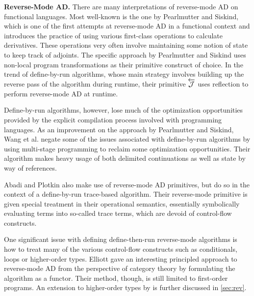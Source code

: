 \textbf{Reverse-Mode AD.} There are many interpretations of reverse-mode AD on functional languages.
Most well-known is the one by Pearlmutter and Siskind\cite{PearlmutterSiskind2008}, which is one of the first attempts at reverse-mode AD in a functional context and introduces the practice of using various first-class operations to calculate derivatives.
These operations very often involve maintaining some notion of state to keep track of adjoints.
The specific approach by Pearlmutter and Siskind uses non-local program transformations as their primitive construct of choice.
In the trend of define-by-run algorithms, whose main strategy involves building up the reverse pass of the algorithm during runtime, their primitive $\overleftarrow{\mathcal{J}}$ uses reflection to perform reverse-mode AD at runtime.

Define-by-run algorithms, however, lose much of the optimization opportunities provided by the explicit compilation process involved with programming languages.
As an improvement on the approach by Pearlmutter and Siskind, Wang et al.\cite{ShiftReset:Backprop} negate some of the issues associated with define-by-run algorithms by using multi-stage programming to reclaim some optimization opportunities.
Their algorithm makes heavy usage of both delimited continuations as well as state by way of references.

Abadi and Plotkin\cite{10.1145/3371106} also make use of reverse-mode AD primitives, but do so in the context of a define-by-run trace-based algorithm.
Their reverse-mode primitive is given special treatment in their operational semantics, essentially symbolically evaluating terms into so-called trace terms, which are devoid of control-flow constructs.

One significant issue with defining define-then-run reverse-mode algorithms is how to treat many of the various control-flow constructs such as conditionals, loops or higher-order types.
Elliott\cite{Elliott-2018-ad-icfp} gave an interesting principled approach to reverse-mode AD from the perspective of category theory by formulating the algorithm as a functor.
Their method, though, is still limited to first-order programs.
An extension to higher-order types by \Vakar{}\cite{vkr2020reverse} is further discussed in \cref{sec:rev}.
